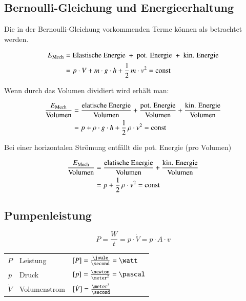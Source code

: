 \subsection{Bernoulli-Gleichung und Energieerhaltung}

Die in der Bernoulli-Gleichung vorkommenden Terme können als  betrachtet werden.

\vspace{-0.3cm}

\begin{align*}
	E_{\rm Mech}	&= \text{Elastische Energie } + \text{ pot. Energie } + \text{ kin. Energie} \\
					&= p \cdot V + m \cdot g \cdot h + \frac{1}{2} \, m \cdot v^2 = \mathop{} \! \mathrm{const}
\end{align*}



Wenn durch das Volumen dividiert wird erhält man: 

\vspace{-0.3cm}

\begin{align*}
	\frac{E_{\rm Mech}}{\text{Volumen}}	&= \frac{\text{elatische Energie}}{\text{Volumen}} + \frac{\text{pot. Energie}}{\text{Volumen}} + \frac{\text{kin. Energie}}{\text{Volumen}} \\
										&= p + \rho \cdot g \cdot h + \frac{1}{2} \, \rho \cdot v^2 = \mathop{} \! \mathrm{const}
\end{align*}


Bei einer horizontalen Strömung entfällt die pot. Energie (pro Volumen)

\vspace{-0.3cm}

\begin{align*}
	\frac{E_{\rm Mech}}{\text{Volumen}}	&= \frac{\text{elatische Energie}}{\text{Volumen}} + \frac{\text{kin. Energie}}{\text{Volumen}} \\
										&= p + \frac{1}{2} \, \rho \cdot v^2 = \mathop{} \! \mathrm{const}
\end{align*}

\subsection{Pumpenleistung}

$$ \boxed {P= \frac{W}{t} = p \cdot \dot{V} = p \cdot A \cdot v}$$

\begin{tabular}{c l l}
	$P$ & Leistung & $[P] = \frac{\joule}{\second} = \watt $   \\
	$p$ & Druck       & $[p] = \frac{\newton}{\meter^2} = \pascal$ \\
	$\dot{V}$ & Volumenstrom   & $[\dot{V}] = \frac{\meter^3}{\second}$
\end{tabular}

